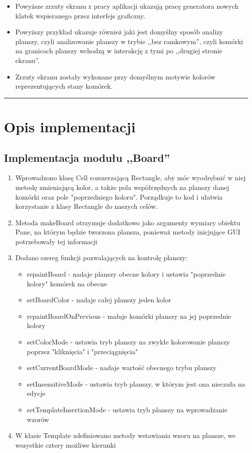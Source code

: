 \documentclass[a4paper,11pt]{article}
\newcommand{\linia}{\rule{\linewidth}{0.4mm}}
\begin{document}
\begin{itemize}
\item Powyższe zrzuty ekranu z pracy aplikacji ukazują pracę generatora nowych klatek wspieranego przez interfejs graficzny. 
\item Powyższy przykład ukazuje również jaki jest domyślny sposób analizy planszy, czyli analizowanie planszy w trybie ,,bez ramkowym'', czyli komórki na granicach planszy wchodzą w interakcję z tymi po ,,drugiej stronie ekranu''.
\item Zrzuty ekranu zostały wykonane przy domyślnym motywie kolorów reprezentujących stany komórek.
\end{itemize}

\noindent\linia
\section{Opis implementacji}

\subsection{Implementacja modułu ,,Board''}

\begin{enumerate}
\item Wprowadzono klasę Cell rozszerzającą Rectangle, aby móc wyodrębnić w niej metodę zmieniającą kolor, a także pola współrzędnych na planszy danej komórki oraz pole "poprzedniego koloru". Porządkuje to kod i ułatwia korzystanie z klasy Rectangle do naszych celów.
\item Metoda makeBoard otrzymuje dodatkowo jako argumenty wymiary obiektu Pane, na którym będzie tworzona plansza, ponieważ metody inicjujące GUI potrzebowały tej informacji
\item Dodano szereg funkcji pozwalających na kontrolę planszy:
	\begin{itemize}
	\item repaintBoard - nadaje planszy obecne kolory i ustawia "poprzednie kolory" komórek na obecne
	\item setBoardColor - nadaje całej planszy jeden kolor
	\item repaintBoardOnPrevious - maluje komórki planszy na jej poprzednie kolory
	\item setColorMode - ustawia tryb planszy na zwykłe kolorowanie planszy poprzez "kliknięcia" i "przeciągnięcia"
	\item setCurrentBoardMode - nadaje wartość obecnego trybu planszy
	\item setInsensitiveMode - ustawia tryb planszy, w którym jest ona nieczuła na edycje
	\item setTemplateInsertionMode - ustawia tryb planszy na wprowadzanie wzorów
	\end{itemize}

\item W klasie Template zdefiniowano metody wstawiania wzoru na plansze, we wszystkie cztery możliwe kierunki

\end{enumerate}
\end{document}

